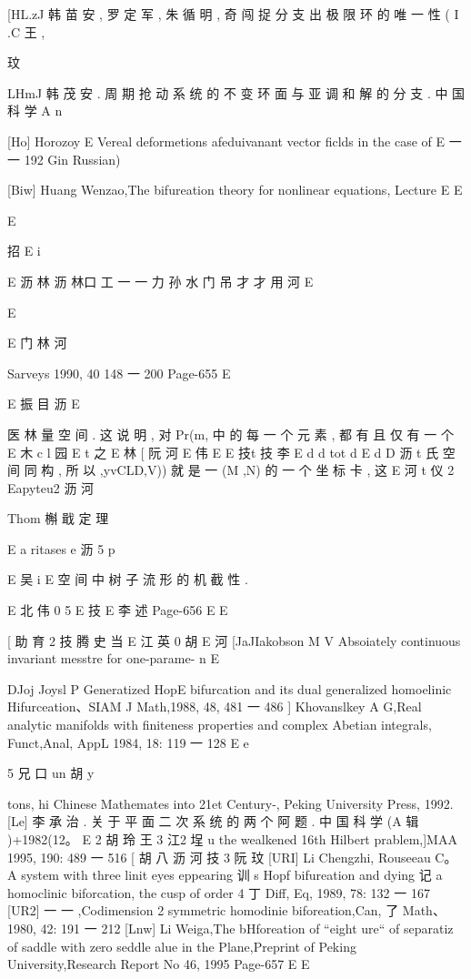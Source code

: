[HL.zJ 韩 苗 安 , 罗 定 军 , 朱 循 明 , 奇 闯 捉 分 支 出 极 限 环 的 唯 一 性 ( I .C 王 ,

玟

LHmJ 韩 茂 安 . 周 期 抢 动 系 统 的 不 变 环 面 与 亚 调 和 解 的 分 支 . 中 国 科 学 A
n

[Ho] Horozoy E Vereal deformetions afeduivanant vector ficlds in the case of
E 一
一 192 Gin Russian)

[Biw] Huang Wenzao,The bifureation theory for nonlinear equations, Lecture
E
E

E

招
E i

E 沥 林 沥 林口 工 一 一 力 孙 水 门 吊 才 才 用 河
E

E

E 门 林 河

Sarveys 1990, 40 148 一 200
Page-655
E

E 振 目 沥
E

医 林
量 空 间 . 这 说 明 , 对 Pr(m, 中 的 每 一 个 元 素 , 都 有 且 仅 有 一 个
E 木 c l 园
E t 之
E 林
[ 阮 河
E 伟
E
E
技t 技 李
E d d tot d
E d D 沥 t
氏 空 间 同 构 , 所 以 ,yvCLD,V)) 就 是 一 (M ,N) 的 一 个 坐 标 卡 , 这
E
河 t 仪 2
Eapyteu2 沥 河

Thom 槲 戢 定 理

E a ritases e 沥 5
p

E 吴 i
E
空 间 中 树 子 流 形 的 机 截 性 .

E 北 伟 0 5
E 技
E 李 述
Page-656
E E

[ 助 育 2 技
腾 史 当
E 江 英 0 胡
E
河
[JaJIakobson M V Absoiately continuous invariant messtre for one-parame-
n
E

DJoj Joysl P Generatized HopE bifurcation and its dual generalized homoelinic
Hifurceation、SIAM J Math,1988, 48, 481 一 486
] Khovanslkey A G,Real analytic manifolds with finiteness properties and
complex Abetian integrals, Funct,Anal, AppL 1984, 18: 119 一 128
E e

5 兄 口 un 胡 y

tons, hi Chinese Mathemates into 21et Century-, Peking University
Press, 1992.
[Le] 李 承 治 . 关 于 平 面 二 次 系 统 的 两 个 阿 题 . 中 国 科 学 (A 辑 )+1982(12。
E
2 胡 玲 王 3 江2 埕 u
the wealkened 16th Hilbert prablem,]MAA 1995, 190: 489 一 516
[ 胡 八 沥 河 技
3
阮
玟
[URI] Li Chengzhi, Rouseeau C。 A system with three linit eyes eppearing
训 s Hopf bifureation and dying 记 a homoclinic biforcation, the cusp of
order 4 丁 Diff, Eq, 1989, 78: 132 一 167
[UR2] 一 一 ,Codimension 2 symmetric homodinie biforeation,Can, 了
Math、 1980, 42: 191 一 212
[Lnw] Li Weiga,The bHforeation of “eight ure“ of separatiz of saddle with
zero seddle alue in the Plane,Preprint of Peking University,Research
Report No 46, 1995
Page-657
E E

